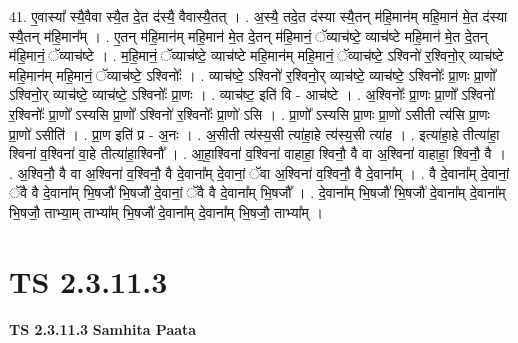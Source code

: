 \documentclass[17pt]{extarticle}
\begin{document}
41. ए॒वास्या᳚ स्यै॒वैवा स्यै॒त दे॒त द॑स्यै॒ वैवास्यै॒तत् । . अ॒स्यै॒ तदे॒त द॑स्या स्यै॒तन् म॑हि॒मान॑म् महि॒मान॑ मे॒त द॑स्या स्यै॒तन् म॑हि॒मान᳚म् । . ए॒तन् म॑हि॒मान॑म् महि॒मान॑ मे॒त दे॒तन् म॑हि॒मानं॒ ॅव्याच॑ष्टे॒ व्याच॑ष्टे महि॒मान॑ मे॒त दे॒तन् म॑हि॒मानं॒ ॅव्याच॑ष्टे । . म॒हि॒मानं॒ ॅव्याच॑ष्टे॒ व्याच॑ष्टे महि॒मान॑म् महि॒मानं॒ ॅव्याच॑ष्टे॒ ऽश्विनो॑ र॒श्विनो॒र् व्याच॑ष्टे महि॒मान॑म् महि॒मानं॒ ॅव्याच॑ष्टे॒ ऽश्विनोः᳚ । . व्याच॑ष्टे॒ ऽश्विनो॑ र॒श्विनो॒र् व्याच॑ष्टे॒ व्याच॑ष्टे॒ ऽश्विनोः᳚ प्रा॒णः प्रा॒णो᳚ ऽश्विनो॒र् व्याच॑ष्टे॒ व्याच॑ष्टे॒ ऽश्विनोः᳚ प्रा॒णः । . व्याच॑ष्ट॒ इति॑ वि - आच॑ष्टे । . अ॒श्विनोः᳚ प्रा॒णः प्रा॒णो᳚ ऽश्विनो॑ र॒श्विनोः᳚ प्रा॒णो᳚ ऽस्यसि प्रा॒णो᳚ ऽश्विनो॑ र॒श्विनोः᳚ प्रा॒णो॑ ऽसि । . प्रा॒णो᳚ ऽस्यसि प्रा॒णः प्रा॒णो॑ ऽसीती त्य॑सि प्रा॒णः प्रा॒णो॑ ऽसीति॑ । . प्रा॒ण इति॑ प्र - अ॒नः । . अ॒सीती त्य॑स्य॒सी त्या॑हा॒हे त्य॑स्य॒सी त्या॑ह । . इत्या॑हा॒हे तीत्या॑हा॒ श्विना॑ व॒श्विना॑ वा॒हे तीत्या॑हा॒श्विनौ᳚ । . आ॒हा॒श्विना॑ व॒श्विना॑ वाहाहा॒ श्विनौ॒ वै वा अ॒श्विना॑ वाहाहा॒ श्विनौ॒ वै । . अ॒श्विनौ॒ वै वा अ॒श्विना॑ व॒श्विनौ॒ वै दे॒वाना᳚म् दे॒वानां॒ ॅवा अ॒श्विना॑ व॒श्विनौ॒ वै दे॒वाना᳚म् । . वै दे॒वाना᳚म् दे॒वानां॒ ॅवै वै दे॒वाना᳚म् भि॒षजौ॑ भि॒षजौ॑ दे॒वानां॒ ॅवै वै दे॒वाना᳚म् भि॒षजौ᳚ । . दे॒वाना᳚म् भि॒षजौ॑ भि॒षजौ॑ दे॒वाना᳚म् दे॒वाना᳚म् भि॒षजौ॒ ताभ्या॒म् ताभ्या᳚म् भि॒षजौ॑ दे॒वाना᳚म् दे॒वाना᳚म् भि॒षजौ॒ ताभ्या᳚म् । \newline
\pagebreak
{}
\section*{ TS 2.3.11.3 }

\textbf{TS 2.3.11.3 } \newline
\textbf{Samhita Paata} \newline
\end{document}
